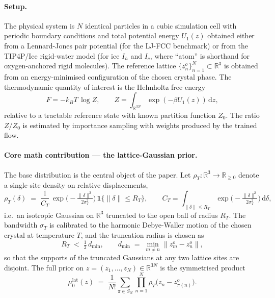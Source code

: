 \documentclass[11pt,letterpaper]{article}
\newcommand{\Real}{\mathbb{R}}
\newcommand{\Le}{\leqslant}
\newcommand{\Ge}{\geqslant}
\newcommand{\dd}{\mathrm{d}}
\theoremstyle{plain}
\begin{document}
\paragraph{Setup.} The physical system is $N$ identical particles in a cubic
simulation cell with periodic boundary conditions and total potential energy
$U_1(z)$ obtained either from a Lennard-Jones pair potential (for the LJ-FCC
benchmark) or from the TIP4P/Ice rigid-water model (for ice $I_h$ and $I_c$,
where ``atom'' is shorthand for oxygen-anchored rigid molecules). The
reference lattice $\{z^o_n\}_{n=1}^N\subset\Real^3$ is obtained from an
energy-minimised configuration of the chosen crystal phase. The thermodynamic
quantity of interest is the Helmholtz free energy
\[
  F = -k_B T\,\log Z, \qquad Z=\int_{\Real^{3N}}\exp(-\beta U_1(z))\,\dd z,
\]
relative to a tractable reference state with known partition function $Z_0$.
The ratio $Z/Z_0$ is estimated by importance sampling with weights produced
by the trained flow.

\paragraph{Core math contribution --- the lattice-Gaussian prior.} The base
distribution is the central object of the paper. Let
$\rho_T:\Real^3\to\Real_{\Ge 0}$ denote a single-site density on relative
displacements,
\begin{equation}\label{eq:wirn-rho}
  \rho_T(\delta) \;=\; \frac{1}{C_T}\,\exp\!\Big(-\tfrac{\|\delta\|^2}{2\sigma_T^2}\Big)\,
    \mathbf 1\!\{\|\delta\|\Le R_T\},\qquad
  C_T = \int_{\|\delta\|\Le R_T}\exp\!\Big(-\tfrac{\|\delta\|^2}{2\sigma_T^2}\Big)\,\dd\delta,
\end{equation}
i.e.\ an isotropic Gaussian on $\Real^3$ truncated to the open ball of
radius $R_T$. The bandwidth $\sigma_T$ is calibrated to the harmonic
Debye-Waller motion of the chosen crystal at temperature $T$, and the
truncation radius is chosen as
\begin{equation}\label{eq:wirn-radius}
  R_T \;<\; \tfrac12\,d_{\min},\qquad d_{\min} \;=\; \min_{m\neq n}\|z^o_m - z^o_n\|,
\end{equation}
so that the supports of the truncated Gaussians at any two lattice sites
are disjoint. The full prior on $z=(z_1,\dots,z_N)\in\Real^{3N}$ is the
symmetrised product
\begin{equation}\label{eq:wirn-prior}
  \mu_0^{\mathrm{lat}}(z) \;=\; \frac{1}{N!}\sum_{\pi\in S_N}\prod_{n=1}^N \rho_T\!\big(z_n - z^o_{\pi(n)}\big).
\end{equation}
\end{document}

